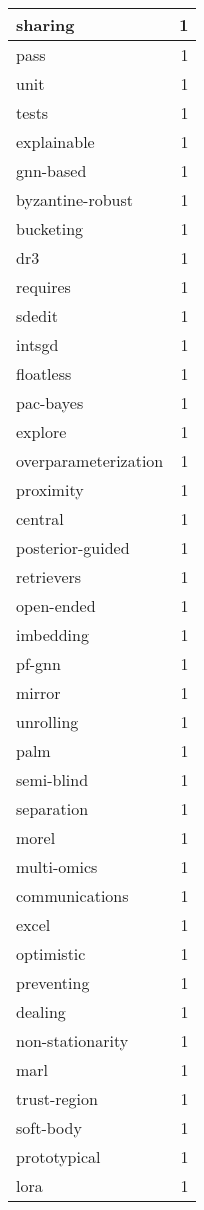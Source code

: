 \begin{table}[h]
\begin{tabular}{|l|r|}
\hline
sharing & 1 \\
\hline
pass & 1 \\
\hline
unit & 1 \\
\hline
tests & 1 \\
\hline
explainable & 1 \\
\hline
gnn-based & 1 \\
\hline
byzantine-robust & 1 \\
\hline
bucketing & 1 \\
\hline
dr3 & 1 \\
\hline
requires & 1 \\
\hline
sdedit & 1 \\
\hline
intsgd & 1 \\
\hline
floatless & 1 \\
\hline
pac-bayes & 1 \\
\hline
explore & 1 \\
\hline
overparameterization & 1 \\
\hline
proximity & 1 \\
\hline
central & 1 \\
\hline
posterior-guided & 1 \\
\hline
retrievers & 1 \\
\hline
open-ended & 1 \\
\hline
imbedding & 1 \\
\hline
pf-gnn & 1 \\
\hline
mirror & 1 \\
\hline
unrolling & 1 \\
\hline
palm & 1 \\
\hline
semi-blind & 1 \\
\hline
separation & 1 \\
\hline
morel & 1 \\
\hline
multi-omics & 1 \\
\hline
communications & 1 \\
\hline
excel & 1 \\
\hline
optimistic & 1 \\
\hline
preventing & 1 \\
\hline
dealing & 1 \\
\hline
non-stationarity & 1 \\
\hline
marl & 1 \\
\hline
trust-region & 1 \\
\hline
soft-body & 1 \\
\hline
prototypical & 1 \\
\hline
lora & 1 \\

\end{tabular}
\end{table}
